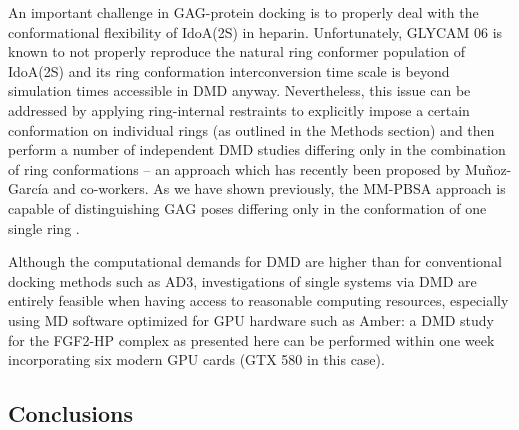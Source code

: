 An important challenge in GAG-protein docking is to properly deal with the
conformational flexibility of IdoA(2S) in
heparin\cite{Mulloy_dyn_conf_heparin_2000, barbero_jacs_2005}. Unfortunately,
GLYCAM 06 is known to not properly reproduce the natural ring conformer
population of IdoA(2S) \cite{gandhi_idoa2s_2010} and its ring conformation
interconversion time scale is beyond simulation times accessible in DMD
anyway{\cite{almond_jacs_2010}}. Nevertheless, this issue can be addressed by
applying ring-internal restraints to explicitly impose a certain conformation on
individual rings (as outlined in the Methods section) and then perform a number
of independent DMD studies differing only in the combination of ring
conformations -- an approach which has recently been proposed by Mu\~noz-
Garc\'ia and co-workers{\cite{conf_idoa_timeavg_restraints_2013}}. As we have
shown previously, the MM-PBSA approach is capable of distinguishing GAG poses
differing only in the conformation of one single
ring \cite{Samsonov_rings_cr_2013}.

Although the computational demands for DMD are higher than for conventional
docking methods such as AD3, investigations of single systems via DMD are
entirely feasible when having access to reasonable computing resources,
especially using MD software optimized for GPU hardware such as Amber: a DMD
study for the FGF2-HP complex as presented here can be performed within one week
incorporating six modern GPU cards (GTX 580 in this case).




\subsection{Conclusions}

